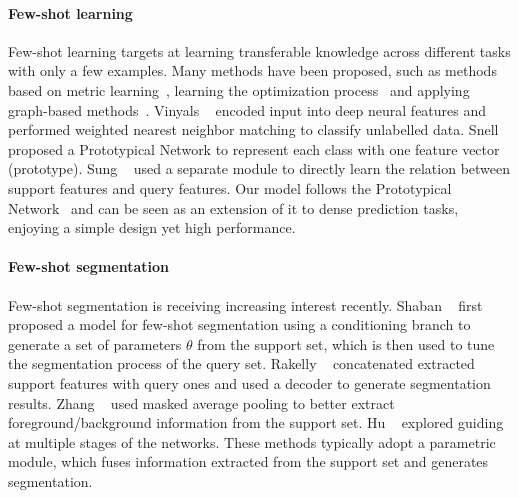 \documentclass[10pt,twocolumn,letterpaper]{article}
\begin{document}
\vspace{-10pt}
\paragraph{Few-shot learning} Few-shot learning targets at learning transferable knowledge across different tasks with only a few examples. Many methods have been proposed, such as methods based on metric learning~\cite{vinyals2016matching, snell2017prototypical}, learning the optimization process~\cite{ravi2016optimization, finn2017model} and applying graph-based methods~\cite{garcia2018fewshot, liu2018learning}. Vinyals \etal~\cite{vinyals2016matching} encoded input into deep neural features and performed weighted nearest neighbor matching to classify unlabelled data. Snell \etal~\cite{snell2017prototypical} proposed a Prototypical Network to represent each class with one feature vector (prototype). Sung \etal~\cite{sung2018learning} used a separate module to directly learn the relation between support features and query features. Our model follows the Prototypical Network~\cite{snell2017prototypical} and can be seen as an extension of it to dense prediction tasks, enjoying a simple design yet high performance.

\vspace{-10pt}
\paragraph{Few-shot segmentation} 
Few-shot segmentation is receiving increasing interest recently. Shaban \etal~\cite{shaban2017one} first proposed a model for few-shot segmentation using a conditioning branch to generate a set of parameters $\theta$ from the support set, which is then used to tune the segmentation process of the query set. Rakelly \etal~\cite{rakelly2018conditional} concatenated extracted support features with  query ones and used a decoder to generate segmentation results. Zhang \etal~\cite{zhang2018sg} used masked average
pooling to better extract foreground/background information from the support set. Hu \etal~\cite{Hu2018AttentionbasedMG} explored guiding at multiple stages of the networks. These methods typically adopt a parametric module, which fuses information extracted from the support set and generates segmentation. 
\end{document}
